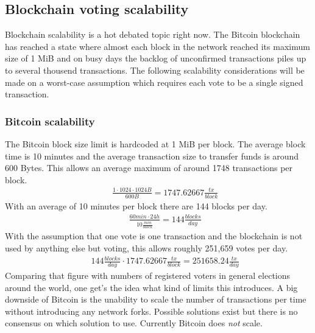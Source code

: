 \documentclass[9pt,oneside]{amsart}
\begin{document}
\begin{multicols}{2}
\subsection{Blockchain voting scalability}
Blockchain scalability is a hot debated topic right now. The Bitcoin blockchain has reached a state where almost each block in the network reached its maximum size of 1 MiB and on busy days the backlog of unconfirmed transactions piles up to several thousend transactions. The following scalability considerations will be made on a worst-case assumption which requires each vote to be a single signed transaction.
\subsubsection{Bitcoin scalability}
The Bitcoin block size limit is hardcoded at 1 MiB per block. The average block time is 10 minutes and the average transaction size to transfer funds is around 600 Bytes. This allows an average maximum of around 1748 transactions per block.
\begin{eqnarray}
& & \frac{1 \cdot 1024 \cdot 1024 B}{600 B} = 1747.62667 \frac {tx} {block}
\end{eqnarray}
With an average of 10 minutes per block there are 144 blocks per day.
\begin{eqnarray}
& & \frac{60 min \cdot 24 h}{10 \frac{min}{block}} = 144 \frac {blocks}{day}
\end{eqnarray}
With the assumption that one vote is one transaction and the blockchain is not used by anything else but voting, this allows roughly 251,659 votes per day.
\begin{eqnarray}
& & 144 \frac {blocks}{day} \cdot 1747.62667 \frac {tx} {block} = 251658.24 \frac{tx}{day}
\end{eqnarray}
Comparing that figure with numbers of registered voters in general elections around the world, one get's the idea what kind of limits this introduces. A big downside of Bitcoin is the unability to scale the number of transactions per time without introducing any network forks. Possible solutions exist but there is no consensus on which solution to use. Currently Bitcoin does \textit{not} scale.

\end{multicols}
\end{document}
